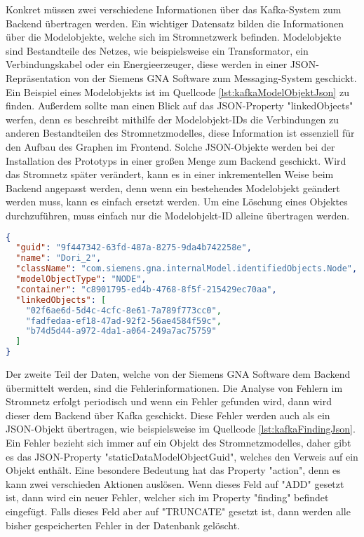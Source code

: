 Konkret müssen zwei verschiedene Informationen über das Kafka-System zum Backend übertragen werden. Ein wichtiger Datensatz bilden die Informationen über die Modelobjekte, welche sich im Stromnetzwerk befinden. Modelobjekte sind Bestandteile des Netzes, wie beispielsweise ein Transformator, ein Verbindungskabel oder ein Energieerzeuger, diese werden in einer JSON-Repräsentation von der Siemens GNA Software zum Messaging-System geschickt. Ein Beispiel eines Modelobjekts ist im Quellcode \ref{lst:kafkaModelObjektJson} zu finden. Außerdem sollte man einen Blick auf das JSON-Property "linkedObjects" werfen, denn es beschreibt mithilfe der Modelobjekt-IDs die Verbindungen zu anderen Bestandteilen des Stromnetzmodelles, diese Information ist essenziell für den Aufbau des Graphen im Frontend. Solche JSON-Objekte werden bei der Installation des Prototyps in einer großen Menge zum Backend geschickt. Wird das Stromnetz später verändert, kann es in einer inkrementellen Weise beim Backend angepasst werden, denn wenn ein bestehendes Modelobjekt geändert werden muss, kann es einfach ersetzt werden. Um eine Löschung eines Objektes durchzuführen, muss einfach nur die Modelobjekt-ID alleine übertragen werden. 

\begin{lstlisting}[language={json},caption={Ein JSON-File, welches ein Modelobjekt im Stromnetzwerk beschreibt},captionpos=b,label={lst:kafkaModelObjektJson}]
{
  "guid": "9f447342-63fd-487a-8275-9da4b742258e",
  "name": "Dori_2",
  "className": "com.siemens.gna.internalModel.identifiedObjects.Node",
  "modelObjectType": "NODE",
  "container": "c8901795-ed4b-4768-8f5f-215429ec70aa",
  "linkedObjects": [
    "02f6ae6d-5d4c-4cfc-8e61-7a789f773cc0",
    "fadfedaa-ef18-47ad-92f2-56ae4584f59c",
    "b74d5d44-a972-4da1-a064-249a7ac75759"
  ]
}
\end{lstlisting}

Der zweite Teil der Daten, welche von der Siemens GNA Software dem Backend übermittelt werden, sind die Fehlerinformationen. Die Analyse von Fehlern im Stromnetz erfolgt periodisch und wenn ein Fehler gefunden wird, dann wird dieser dem Backend über Kafka geschickt. Diese Fehler werden auch als ein JSON-Objekt übertragen, wie beispielsweise im Quellcode \ref{lst:kafkaFindingJson}. Ein Fehler bezieht sich immer auf ein Objekt des Stromnetzmodelles, daher gibt es das JSON-Property "staticDataModelObjectGuid", welches den Verweis auf ein Objekt enthält. Eine besondere Bedeutung hat das Property "action", denn es kann zwei verschieden Aktionen auslösen. Wenn dieses Feld auf "ADD" gesetzt ist, dann wird ein neuer Fehler, welcher sich im Property "finding" befindet eingefügt. Falls dieses Feld aber auf "TRUNCATE" gesetzt ist, dann werden alle bisher gespeicherten Fehler in der Datenbank gelöscht. 

